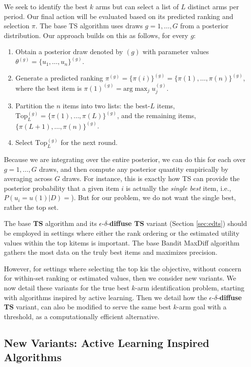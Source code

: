 \documentclass[nonblindrev]{informs3}
\newcommand{\ts}{\textbf{TS} }
\newcommand{\edts}{$\epsilon$-$\delta$-\textbf{diffuse TS} }
\newcommand{\numitems}{n}
\newcommand{\numtopset}{k}
\newcommand{\numperset}{L}
\begin{document}
We seek to identify the best $k$ arms but can select a list of $\numperset$ distinct arms per period. Our final action will be evaluated based on its predicted ranking and selection $\pi$. The base TS algorithm uses draws $g=1,\ldots,G$ from a posterior distribution. Our approach builds on this as follows, for every $g$:
\begin{enumerate}
	\item Obtain a posterior draw denoted by $(g)$ with parameter values $\theta^{(g)} = \{u_1,\ldots,u_\numitems\}^{(g)}$. 
	\item Generate a predicted ranking $\pi^{(g)} = \{\pi(i)\}^{(g)} = \{ \pi(1),\ldots,\pi(\numitems) \}^{(g)}$, where the best item is $\pi(1)^{(g)} = \text{arg}\max_{j} u_j^{(g)}$.
	\item Partition the $\numitems$ items into two lists: the best-$L$ items, $\text{Top}_L^{(g)}=\{ \pi(1), \ldots,\pi(L) \}^{(g)}$, and the remaining items, $\{ \pi(L+1), \ldots,\pi(\numitems) \}^{(g)}$.
	\item Select $\text{Top}_L^{(g)}$ for the next round. 
\end{enumerate}
Because we are integrating over the entire posterior, we can do this for each over $g=1,\ldots,G$ draws, and then compute any posterior quantity empirically by averaging across $G$ draws. For instance, this is exactly how TS can provide the posterior probability that a given item $i$ is actually the \emph{single best} item, i.e., $P( u_i = u(1) | D ) =  $). But for our problem, we do not want the single best, rather the top set. 

The base \ts algorithm and its \edts variant (Section \ref{sec:edts}) should be employed in settings where either the rank ordering or the estimated utility values within the top \numtopset items is important. The base Bandit MaxDiff algorithm gathers the most data on the truly best items and maximizes precision.

However, for settings where selecting the top \numtopset is the objective, without concern for within-set ranking or estimated values, then we consider new variants. We now detail these variants for the true best $k$-arm identification problem, starting with algorithms inspired by active learning. Then we detail how the \edts variant, can also be modified to serve the same best $k$-arm goal with a threshold, as a computationally efficient alternative. 

\subsection{New Variants: Active Learning Inspired Algorithms}
\end{document}
